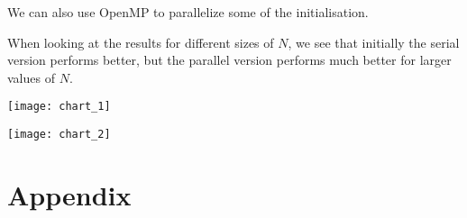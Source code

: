 \documentclass[12pt]{report}
\begin{document}
We can also use OpenMP to parallelize some of the initialisation.

When looking at the results for different sizes of $N$, we see that initially the serial version performs better, but the parallel version performs much better for larger values of $N$.

\texttt{[image: chart\_1]}


\texttt{[image: chart\_2]}

\newpage
\section*{Appendix}

\lstset{
	tabsize=2
}

\end{document}
